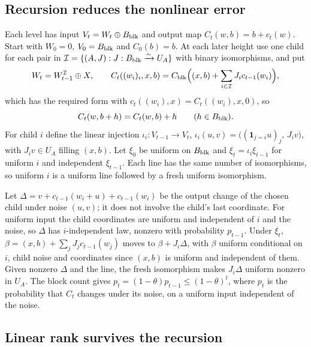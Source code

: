 \documentclass[11pt]{article}
\newcommand{\ind}{\mathbf 1}
\begin{document}
\subsection{Recursion reduces the nonlinear error}

Each level has input $V_t=W_t\oplus B_{\rm blk}$ and output map
$C_t(w,b)=b+c_t(w)$. Start with $W_0=0$, $V_0=B_{\rm blk}$ and $C_0(b)=b$.
At each later height use one child for each pair in $\mathcal
I=\{(A,J):J:B_{\rm blk}\xrightarrow{\sim}U_A\}$ with binary isomorphisms,
and put
\[
 W_t=W_{t-1}^{\mathcal I}\oplus X,\qquad
 C_t((w_i)_i,x,b)=C_{\rm blk}\Bigl((x,b)+\sum_{i\in\mathcal I}J_ic_{t-1}(w_i)\Bigr),
\]
which has the required form with $c_t((w_i),x)=C_t((w_i),x,0)$, so
\begin{equation}
 C_t(w,b+h)=C_t(w,b)+h\qquad(h\in B_{\rm blk}).
 \label{latent:recursive-symmetry}
\end{equation}
For child $i$ define the linear injection $\iota_i:V_{t-1}\to V_t$,
$\iota_i(u,v)=\bigl((\ind_{j=i}u)_j,\,J_iv\bigr)$, with $J_iv\in U_A$
filling $(x,b)$. Let $\xi_0$ be uniform on $B_{\rm blk}$ and
$\xi_t=\iota_i\xi_{t-1}$ for uniform $i$ and independent $\xi_{t-1}$. Each
line has the same number of isomorphisms, so uniform $i$ is a uniform line
followed by a fresh uniform isomorphism.

Let $\Delta=v+c_{t-1}(w_i+u)+c_{t-1}(w_i)$ be the output change of the
chosen child under noise $(u,v)$; it does not involve the child's last
coordinate. For uniform input the child coordinates are uniform and
independent of $i$ and the noise, so $\Delta$ has $i$-independent law,
nonzero with probability $p_{t-1}$. Under $\xi_t$,
$\beta=(x,b)+\sum_jJ_jc_{t-1}(w_j)$ moves to $\beta+J_i\Delta$, with
$\beta$ uniform conditional on $i$, child noise and coordinates since
$(x,b)$ is uniform and independent of them. Given nonzero $\Delta$ and the
line, the fresh isomorphism makes $J_i\Delta$ uniform nonzero in $U_A$. The
block count gives $p_t=(1-\theta)p_{t-1}\le(1-\theta)^t$, where $p_t$ is
the probability that $C_t$ changes under its noise, on a uniform input
independent of the noise.

\subsection{Linear rank survives the recursion}
\end{document}
